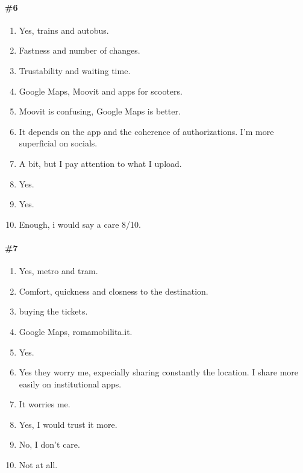 \documentclass[a4paper, 10pt]{article}
\begin{document}
\paragraph*{\#6}
\begin{enumerate}
    \item Yes, trains and autobus.
    \item Fastness and number of changes.
    \item Trustability and waiting time.
    \item Google Maps, Moovit and apps for scooters.
    \item Moovit is confusing, Google Maps is better.
    \item It depends on the app and the coherence of authorizations. I'm more superficial on socials.
    \item A bit, but I pay attention to what I upload.
    \item Yes.
    \item Yes.
    \item Enough, i would say a care 8/10.
\end{enumerate}

\paragraph*{\#7}
\begin{enumerate}
    \item Yes, metro and tram.
    \item Comfort, quickness and closness to the destination.
    \item buying the tickets.
    \item Google Maps, romamobilita.it.
    \item Yes.
    \item Yes they worry me, expecially sharing constantly the location. I share more easily on institutional apps.
    \item It worries me.
    \item Yes, I would trust it more.
    \item No, I don't care.
    \item Not at all.
\end{enumerate}
\end{document}
